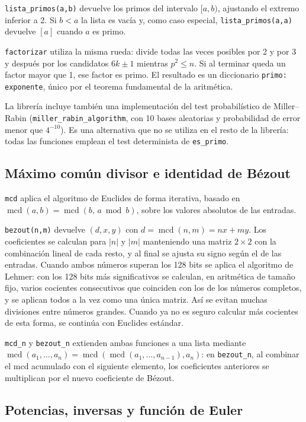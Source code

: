 \documentclass[11pt,a4paper]{article}
\newcommand{\code}[1]{\texttt{#1}}
\begin{document}
\code{lista\_primos(a,b)} devuelve los primos del intervalo $[a,b)$, ajustando el extremo inferior a 2. Si $b<a$ la lista es vacía y, como caso especial, \code{lista\_primos(a,a)} devuelve $[a]$ cuando $a$ es primo.

\code{factorizar} utiliza la misma rueda: divide todas las veces posibles por 2 y por 3 y después por los candidatos $6k\pm1$ mientras $p^2\le n$. Si al terminar queda un factor mayor que 1, ese factor es primo. El resultado es un diccionario \texttt{primo: exponente}, único por el teorema fundamental de la aritmética.

La librería incluye también una implementación del test probabilístico de Miller--Rabin (\code{miller\_rabin\_algorithm}, con 10 bases aleatorias y probabilidad de error menor que $4^{-10}$). Es una alternativa que no se utiliza en el resto de la librería: todas las funciones emplean el test determinista de \code{es\_primo}.

\subsection{Máximo común divisor e identidad de Bézout}

\code{mcd} aplica el algoritmo de Euclides de forma iterativa, basado en $\operatorname{mcd}(a,b)=\operatorname{mcd}(b,\,a \bmod b)$, sobre los valores absolutos de las entradas.

\code{bezout(n,m)} devuelve $(d,x,y)$ con $d=\operatorname{mcd}(n,m)=nx+my$. Los coeficientes se calculan para $|n|$ y $|m|$ manteniendo una matriz $2\times2$ con la combinación lineal de cada resto, y al final se ajusta su signo según el de las entradas. Cuando ambos números superan los 128 bits se aplica el algoritmo de Lehmer: con los 128 bits más significativos se calculan, en aritmética de tamaño fijo, varios cocientes consecutivos que coinciden con los de los números completos, y se aplican todos a la vez como una única matriz. Así se evitan muchas divisiones entre números grandes. Cuando ya no es seguro calcular más cocientes de esta forma, se continúa con Euclides estándar.

\code{mcd\_n} y \code{bezout\_n} extienden ambas funciones a una lista mediante $\operatorname{mcd}(a_1,\dots,a_n)=\operatorname{mcd}(\operatorname{mcd}(a_1,\dots,a_{n-1}),a_n)$: en \code{bezout\_n}, al combinar el mcd acumulado con el siguiente elemento, los coeficientes anteriores se multiplican por el nuevo coeficiente de Bézout.

\subsection{Potencias, inversas y función de Euler}
\end{document}
